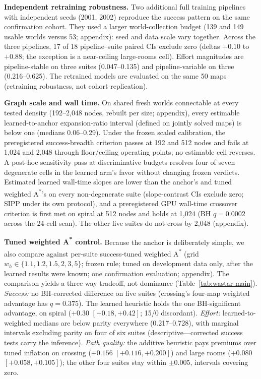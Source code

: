 \documentclass[letterpaper]{article} %
\begin{document}
\textbf{Independent retraining robustness.} Two additional full training pipelines with independent seeds (2001, 2002) reproduce the success pattern on the same confirmation cohort. They used a larger world-collection budget (139 and 149 usable worlds versus 53; appendix): seed and data scale vary together. Across the three pipelines, 17 of 18 pipeline--suite paired CIs exclude zero (deltas $+0.10$ to $+0.88$; the exception is a near-ceiling large-rooms cell). Effort magnitudes are pipeline-stable on three suites (0.047--0.135) and pipeline-variable on three (0.216--0.625). The retrained models are evaluated on the same 50 maps (retraining robustness, not cohort replication).

\textbf{Graph scale and wall time.} On shared fresh worlds connectable at every tested density (192--2{,}048 nodes, rebuilt per size; appendix), every estimable learned-to-anchor expansion-ratio interval (defined on jointly solved maps) is below one (medians 0.06--0.29). Under the frozen scaled calibration, the preregistered success-breadth criterion passes at 192 and 512 nodes and fails at 1{,}024 and 2{,}048 through floor/ceiling operating points; no estimable cell reverses. A post-hoc sensitivity pass at discriminative budgets resolves four of seven degenerate cells in the learned arm's favor without changing frozen verdicts. Estimated learned wall-time slopes are lower than the anchor's and tuned weighted A\textsuperscript{*}'s on every non-degenerate suite (slope-contrast CIs exclude zero; SIPP under its own protocol), and a preregistered GPU wall-time crossover criterion is first met on spiral at 512 nodes and holds at 1{,}024 (BH $q{=}0.0002$ across the 24-cell scan). The other five suites do not cross by 2{,}048 (appendix).

\textbf{Tuned weighted A\textsuperscript{*} control.} Because the anchor is deliberately simple, we also compare against per-suite success-tuned weighted A\textsuperscript{*} (grid $w_h \in \{1.1, 1.2, 1.5, 2, 3, 5\}$; frozen rule; tuned on development data only, after the learned results were known; one confirmation evaluation; appendix). The comparison yields a three-way tradeoff, not dominance (Table~\ref{tab:wastar-main}). \emph{Success:} no BH-corrected difference on five suites (crossing's four-map weighted advantage has $q{=}0.375$). The learned heuristic holds the one BH-significant advantage, on spiral ($+0.30$ $[+0.18,+0.42]$; 15/0 discordant). \emph{Effort:} learned-to-weighted medians are below parity everywhere (0.217--0.728), with marginal intervals excluding parity on four of six suites (descriptive---corrected success tests carry the inference). \emph{Path quality:} the additive heuristic pays premiums over tuned inflation on crossing ($+0.156$ $[+0.116,+0.200]$) and large rooms ($+0.080$ $[+0.058,+0.105]$); the other four suites stay within $\pm 0.005$, intervals covering zero.
\end{document}
